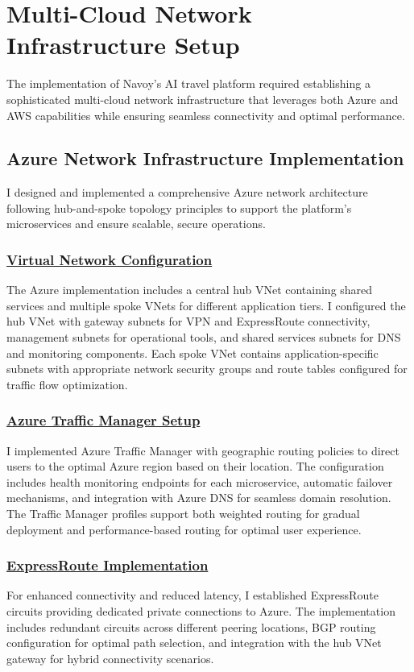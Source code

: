 \section{Multi-Cloud Network Infrastructure Setup}
The implementation of Navoy's AI travel platform required establishing a sophisticated multi-cloud network infrastructure that leverages both Azure and AWS capabilities while ensuring seamless connectivity and optimal performance.

\subsection{Azure Network Infrastructure Implementation}
I designed and implemented a comprehensive Azure network architecture following hub-and-spoke topology principles to support the platform's microservices and ensure scalable, secure operations.

\subsubsection*{\underline{Virtual Network Configuration}}
The Azure implementation includes a central hub VNet containing shared services and multiple spoke VNets for different application tiers. I configured the hub VNet with gateway subnets for VPN and ExpressRoute connectivity, management subnets for operational tools, and shared services subnets for DNS and monitoring components. Each spoke VNet contains application-specific subnets with appropriate network security groups and route tables configured for traffic flow optimization.

\subsubsection*{\underline{Azure Traffic Manager Setup}}
I implemented Azure Traffic Manager with geographic routing policies to direct users to the optimal Azure region based on their location. The configuration includes health monitoring endpoints for each microservice, automatic failover mechanisms, and integration with Azure DNS for seamless domain resolution. The Traffic Manager profiles support both weighted routing for gradual deployment and performance-based routing for optimal user experience.

\subsubsection*{\underline{ExpressRoute Implementation}}
For enhanced connectivity and reduced latency, I established ExpressRoute circuits providing dedicated private connections to Azure. The implementation includes redundant circuits across different peering locations, BGP routing configuration for optimal path selection, and integration with the hub VNet gateway for hybrid connectivity scenarios.

